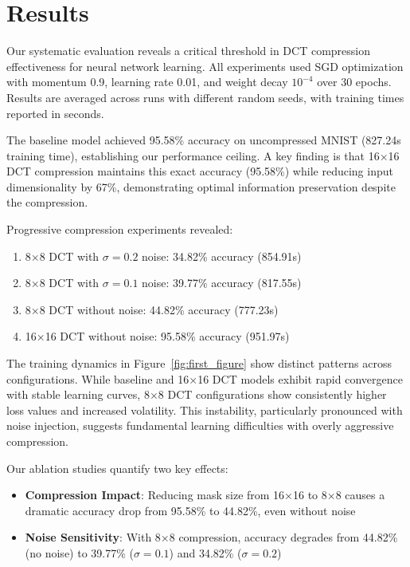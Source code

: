 \documentclass{article} %
\begin{document}
\section{Results}
\label{sec:results}

Our systematic evaluation reveals a critical threshold in DCT compression effectiveness for neural network learning. All experiments used SGD optimization with momentum 0.9, learning rate 0.01, and weight decay $10^{-4}$ over 30 epochs. Results are averaged across runs with different random seeds, with training times reported in seconds.

The baseline model achieved 95.58\% accuracy on uncompressed MNIST (827.24s training time), establishing our performance ceiling. A key finding is that 16×16 DCT compression maintains this exact accuracy (95.58\%) while reducing input dimensionality by 67\%, demonstrating optimal information preservation despite the compression.

Progressive compression experiments revealed:

\begin{enumerate}
    \item 8×8 DCT with $\sigma = 0.2$ noise: 34.82\% accuracy (854.91s)
    \item 8×8 DCT with $\sigma = 0.1$ noise: 39.77\% accuracy (817.55s)
    \item 8×8 DCT without noise: 44.82\% accuracy (777.23s)
    \item 16×16 DCT without noise: 95.58\% accuracy (951.97s)
\end{enumerate}

The training dynamics in Figure~\ref{fig:first_figure} show distinct patterns across configurations. While baseline and 16×16 DCT models exhibit rapid convergence with stable learning curves, 8×8 DCT configurations show consistently higher loss values and increased volatility. This instability, particularly pronounced with noise injection, suggests fundamental learning difficulties with overly aggressive compression.

Our ablation studies quantify two key effects:
\begin{itemize}
    \item \textbf{Compression Impact}: Reducing mask size from 16×16 to 8×8 causes a dramatic accuracy drop from 95.58\% to 44.82\%, even without noise
    \item \textbf{Noise Sensitivity}: With 8×8 compression, accuracy degrades from 44.82\% (no noise) to 39.77\% ($\sigma=0.1$) and 34.82\% ($\sigma=0.2$)
\end{itemize}
\end{document}
